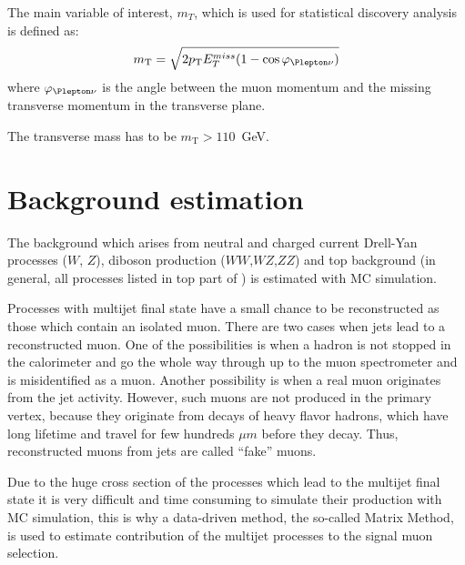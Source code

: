 
The main variable of interest, $m_T$, which is used for statistical discovery analysis is defined as:
\begin{equation}
 m_\mathrm{T} = \sqrt{2 p_\mathrm{T} E_T^{miss} (1-\cos\varphi_{\Plepton\nu})}
\end{equation}
where $\varphi_{\Plepton\nu}$ is the angle between the muon momentum and the missing transverse momentum in the transverse plane.

The transverse mass has to be $m_\mathrm{T} > 110$~GeV.


\section{Background estimation}
\label{sec:wprime_backgroundEstimation}

The background which arises from neutral and charged current Drell-Yan processes ($W$, $Z$), diboson
production ($WW$,$WZ$,$ZZ$) and top background (in general, all processes listed in top part of ) is estimated with MC simulation.

Processes with multijet final state have a small chance to be reconstructed as those which contain
an isolated muon. There are two cases when jets lead to a reconstructed muon. One of the possibilities is when a hadron is not stopped in the calorimeter and go the whole way through up to the muon spectrometer and is misidentified as a muon. Another possibility is when a real muon originates from the jet activity. However, such muons are not produced in the primary vertex, because they originate from decays of heavy flavor hadrons, which have long lifetime and travel for few hundreds $\mu m$ before they decay.
Thus, reconstructed muons from jets are called ``fake'' muons.

Due to the huge cross section of the processes which lead to the multijet final state it is very difficult and time consuming to simulate their production with MC simulation, this is why a data-driven method,
the so-called Matrix Method, is used to estimate contribution of the multijet processes to the signal muon selection.

